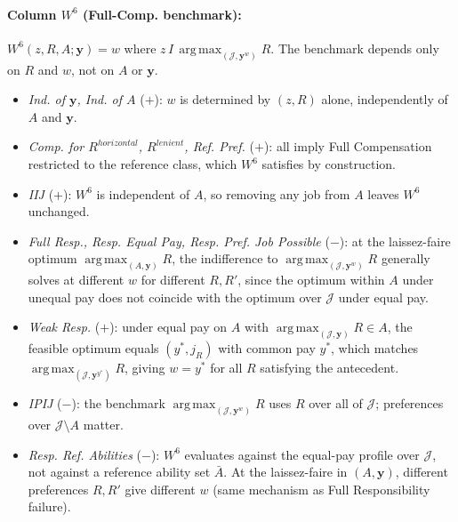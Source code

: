 \documentclass[12pt,thmsb]{article}
\DeclareMathOperator*{\argmax}{arg\,max}
\begin{document}
\paragraph{Column $W^6$ (Full-Comp. benchmark):} $W^6(z,R,A;\mathbf y)=w$ where $z\,I\,\argmax_{(\mathcal J,\mathbf y^w)}R$. The benchmark depends only on $R$ and $w$, not on $A$ or $\mathbf y$.
\begin{itemize}
    \item \emph{Ind. of $\mathbf y$, Ind. of $A$} ($+$): $w$ is determined by $(z,R)$ alone, independently of $A$ and $\mathbf y$.
    \item \emph{Comp. for $R^{horizontal}$, $R^{lenient}$, Ref. Pref.} ($+$): all imply Full Compensation restricted to the reference class, which $W^6$ satisfies by construction.
    \item \emph{IIJ} ($+$): $W^6$ is independent of $A$, so removing any job from $A$ leaves $W^6$ unchanged.
    \item \emph{Full Resp., Resp. Equal Pay, Resp. Pref. Job Possible} ($-$): at the laissez-faire optimum $\argmax_{(A,\mathbf y)}R$, the indifference to $\argmax_{(\mathcal J,\mathbf y^w)}R$ generally solves at different $w$ for different $R,R'$, since the optimum within $A$ under unequal pay does not coincide with the optimum over $\mathcal J$ under equal pay.
    \item \emph{Weak Resp.} ($+$): under equal pay on $A$ with $\argmax_{(\mathcal J,\mathbf y)}R\in A$, the feasible optimum equals $(y^*,j_R)$ with common pay $y^*$, which matches $\argmax_{(\mathcal J,\mathbf y^{y^*})}R$, giving $w=y^*$ for all $R$ satisfying the antecedent.
    \item \emph{IPIJ} ($-$): the benchmark $\argmax_{(\mathcal J,\mathbf y^w)}R$ uses $R$ over all of $\mathcal J$; preferences over $\mathcal J\setminus A$ matter.
    \item \emph{Resp. Ref. Abilities} ($-$): $W^6$ evaluates against the equal-pay profile over $\mathcal J$, not against a reference ability set $\bar A$. At the laissez-faire in $(A,\mathbf y)$, different preferences $R,R'$ give different $w$ (same mechanism as Full Responsibility failure).
\end{itemize}
\end{document}
